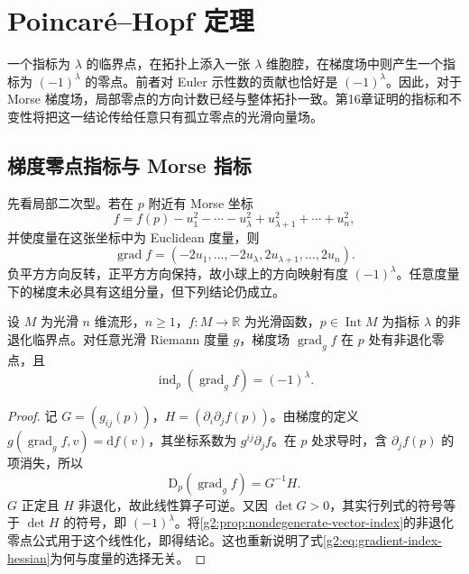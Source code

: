 
% 
% 

\section{Poincaré–Hopf 定理}
\label{g2:sec:1704}

一个指标为 \(\lambda\) 的临界点，在拓扑上添入一张 \(\lambda\) 维胞腔，在梯度场中则产生一个指标为 \((-1)^\lambda\) 的零点。前者对 Euler 示性数的贡献也恰好是 \((-1)^\lambda\)。因此，对于 Morse 梯度场，局部零点的方向计数已经与整体拓扑一致。第16章证明的指标和不变性将把这一结论传给任意只有孤立零点的光滑向量场。

\subsection{梯度零点指标与 Morse 指标}
\label{g2:subsec:1704:01}

先看局部二次型。若在 \(p\) 附近有 Morse 坐标
\[
	f=f(p)-u_1^2-\cdots-u_\lambda^2+u_{\lambda+1}^2+\cdots+u_n^2,
\]
并使度量在这张坐标中为 Euclidean 度量，则
\[
	\operatorname{grad}f=(-2u_1,\ldots,-2u_\lambda,2u_{\lambda+1},\ldots,2u_n).
\]
负平方方向反转，正平方方向保持，故小球上的方向映射有度 \((-1)^\lambda\)。任意度量下的梯度未必具有这组分量，但下列结论仍成立。

\begin{proposition}\label{g2:prop:gradient-morse-index}
	设 \(M\) 为光滑 \(n\) 维流形，\(n\ge1\)，\(f:M\to\mathbb R\) 为光滑函数，\(p\in\operatorname{Int}M\) 为指标 \(\lambda\) 的非退化临界点。对任意光滑 Riemann 度量 \(g\)，梯度场 \(\operatorname{grad}_g f\) 在 \(p\) 处有非退化零点，且
	\[
		\operatorname{ind}_p(\operatorname{grad}_g f)=(-1)^\lambda.
	\]
\end{proposition}
\begin{proof}
	记 \(G=(g_{ij}(p))\)，\(H=(\partial_i\partial_jf(p))\)。由梯度的定义 \(g(\operatorname{grad}_g f,v)=\mathrm df(v)\)，其坐标系数为 \(g^{ij}\partial_jf\)。在 \(p\) 处求导时，含 \(\partial_jf(p)\) 的项消失，所以
	\[
		\mathrm D_p(\operatorname{grad}_g f)=G^{-1}H.
	\]
	\(G\) 正定且 \(H\) 非退化，故此线性算子可逆。又因 \(\det G>0\)，其实行列式的符号等于 \(\det H\) 的符号，即 \((-1)^\lambda\)。将\cref{g2:prop:nondegenerate-vector-index}的非退化零点公式用于这个线性化，即得结论。这也重新说明了式\eqref{g2:eq:gradient-index-hessian}为何与度量的选择无关。
\end{proof}

